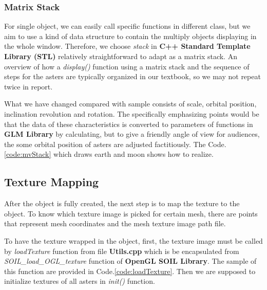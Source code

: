 \documentclass[12pt]{article}
\numberwithin{figure}{subsection}
\numberwithin{table}{subsection}
\numberwithin{equation}{subsection}
\begin{document}
\subsubsection{Matrix Stack}
For single object, we can easily call specific functions in different class, but we aim to use a 
kind of data structure to contain the multiply objects displaying in the whole window.
Therefore, we choose \emph{stack} in \textbf{C++ Standard Template Library (STL)} relatively
straightforward to adapt as a matrix stack.
An overview of how a \emph{display()} function using a matrix stack 
and the sequence of steps for the asters are typically organized in our textbook, so we may not repeat twice in report.

What we have changed compared with sample consists of scale, orbital position, inclination 
revolution and rotation. The specifically emphasizing points would be that 
the data of these characteristics is converted to parameters of functions in \textbf{GLM Library}
by calculating, but to give a friendly angle of view for audiences, the some orbital position of asters are adjusted factitiously. 
The Code.\ref{code:mvStack} which draws earth and moon shows how to realize.
\label{code:mvStack}



\subsection{Texture Mapping}\label{sec:mapping}
After the object is fully created, the next step is to map the texture to the object. 
To know which texture image is picked for certain mesh, there are points that represent mesh 
coordinates and the mesh texture image path file.

To have the texture wrapped in the object, first, the texture image must be called by
\emph{loadTexture} function from file \textbf{Utils.cpp} which is be encapsulated from \emph{SOIL\_load\_OGL\_texture} function of \textbf{OpenGL SOIL Library}. 
The sample of this function are provided in Code.\ref{code:loadTexture}. 
Then we are supposed to initialize textures of all asters in \emph{init()} function.
\label{code:loadTexture} 
  
\end{document}
